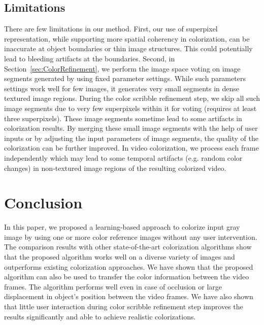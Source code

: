 \documentclass[twocolumn]{svjour3}          %
\begin{document}
\subsection{Limitations}
There are few limitations in our method. First, our use of superpixel representation, while supporting more spatial coherency in colorization, can be inaccurate at object boundaries or thin image structures. This could potentially lead to bleeding artifacts at the boundaries. Second, in Section~\ref{sec:ColorRefinement},  we perform the image space voting on image segments generated by using fixed parameter settings. While such parameters settings work well for few images, it generates very small segments in dense textured image regions. During the color scribble refinement step, we skip all such image segments due to very few superpixels within it for voting (requires at least three superpixels). These image segments sometime lead to some artifacts in colorization results. By merging these small image segments with the help of user inputs or by adjusting the input parameters of image segments, the quality of the colorization can be further improved.  In video colorization, we process each frame independently which may lead to some temporal artifacts (e.g. random color changes) in non-textured image regions of the resulting colorized video.

\section{Conclusion}
\label{sec:5}
In this paper, we proposed a learning-based approach to colorize input gray image by using one or more color reference images without any user intervention. The comparison results with other state-of-the-art colorization algorithms show that the proposed algorithm works well on a diverse variety of images and outperforms existing colorization approaches. We have shown that the proposed algorithm can also be used to transfer the color information between the video frames. The algorithm performs well even in case of occlusion or large displacement in object's position between the video frames. We have also shown that little user interaction during color scribble refinement step improves the results significantly and able to achieve realistic colorizations.
\end{document}

